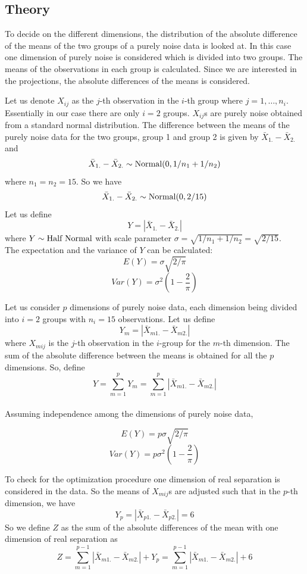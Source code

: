 \documentclass[12]{article}
\begin{document}

\subsection{Theory} \label{sec:theory}

To decide on the different dimensions, the distribution of the absolute difference of the means of the two groups of a purely noise data is looked at. In this case one dimension of purely noise is considered which is divided into two groups. The means of the observations in each group is calculated. Since we are interested in the projections, the absolute differences of the means is considered.

Let us denote $X_{ij}$ as the $j$-th observation in the $i$-th group where $j = 1, \dots, n_i$. Essentially in our case there are only $i = 2$ groups. $X_{ij}$s are purely noise obtained from a standard normal distribution. The difference between the means of the purely noise data for the two groups, group 1 and group 2 is given by $\bar{X}_{1.} - \bar{X}_{2.}$ and $$\bar{X}_{1.} - \bar{X}_{2.} \sim \hbox{Normal}(0, 1/n_1 + 1/n_2)$$ where $n_1 = n_2 = 15$. So we have $$\bar{X}_{1.} - \bar{X}_{2.} \sim \hbox{Normal}(0, 2/15)$$ Let us define $$Y  = |\bar{X}_{1.} - \bar{X}_{2.}|$$ where $Y \sim \hbox{Half Normal}$ with scale parameter $ \sigma = \sqrt{1/n_1 + 1/n_2} = \sqrt{2/15}$. \\

The expectation and the variance of $Y$ can be calculated: 
$$E(Y) = \sigma \sqrt{2/\pi}$$
$$Var(Y) = \sigma^2 (1 - \frac{2}{\pi})$$

Let us consider $p$ dimensions of purely noise data, each dimension being divided into $i = 2$ groups with $n_i = 15$ observations. Let us define $$Y_m = |\bar{X}_{m1.} - \bar{X}_{m2.}|$$ where $X_{mij}$ is the $j$-th observation in the $i$-group for the $m$-th dimension. The sum of the absolute difference between the means is obtained for all the $p$ dimensions. So, define $$Y = \sum_{m=1}^p Y_m = \sum_{m=1}^p |\bar{X}_{m1.} - \bar{X}_{m2.}| $$ \\

Assuming independence among the dimensions of purely noise data,

$$E(Y) = p \sigma \sqrt{2/\pi}$$
$$Var(Y) = p \sigma^2 (1 - \frac{2}{\pi})$$

To check for the optimization procedure one dimension of real separation is considered in the data. So the means of $X_{mij}$s are adjusted such that in the $p$-th dimension, we have $$Y_p = |\bar{X}_{p1.} - \bar{X}_{p2.}| = 6$$ So we define $Z$ as the sum of the absolute differences of the mean with one dimension of real separation as $$Z = \sum_{m=1}^{p-1} |\bar{X}_{m1.} - \bar{X}_{m2.}| + Y_p = \sum_{m=1}^{p-1} |\bar{X}_{m1.} - \bar{X}_{m2.}| + 6$$
\end{document}
